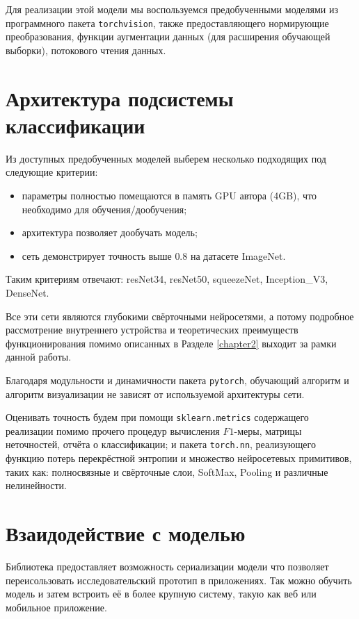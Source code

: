 Для реализации этой модели мы воспользуемся предобученными моделями из программного пакета \texttt{torchvision},
также предоставляющего нормирующие преобразования, функции аугментации данных (для расширения обучающей выборки), потокового чтения данных.

\section{Архитектура подсистемы классификации}

Из доступных предобученных моделей выберем несколько подходящих под следующие критерии:
\begin{itemize}
\item параметры полностью помещаются в память GPU автора (4GB), что необходимо для обучения/дообучения;
\item архитектура позволяет дообучать модель;
\item сеть демонстрирует точность выше $ 0.8 $ на датасете ImageNet.
\end{itemize}
Таким критериям отвечают:
resNet34, resNet50, squeezeNet, Inception\_V3, DenseNet.

Все эти сети являются глубокими свёрточными нейросетями, а потому подробное рассмотрение внутреннего устройства и теоретических преимуществ функционирования помимо описанных в Разделе \ref{chapter2} выходит за рамки данной работы.

Благодаря модульности и динамичности пакета \texttt{pytorch}, обучающий алгоритм и алгоритм визуализации не зависят от используемой архитектуры сети.

Оценивать точность будем при помощи \texttt{sklearn.metrics} содержащего реализации помимо прочего процедур вычисления $ F1 $-меры, матрицы неточностей, отчёта о классификации; и пакета \texttt{torch.nn}, реализующего функцию потерь перекрёстной энтропии и множество нейросетевых примитивов, таких как: полносвязные и свёрточные слои, SoftMax, Pooling и различные нелинейности.

\section{Взаидодействие с моделью}

Библиотека предоставляет возможность сериализации модели что позволяет переисользовать 
исследовательский прототип в приложениях. Так можно обучить модель и затем встроить её в 
более крупную систему, такую как веб или мобильное приложение. 

